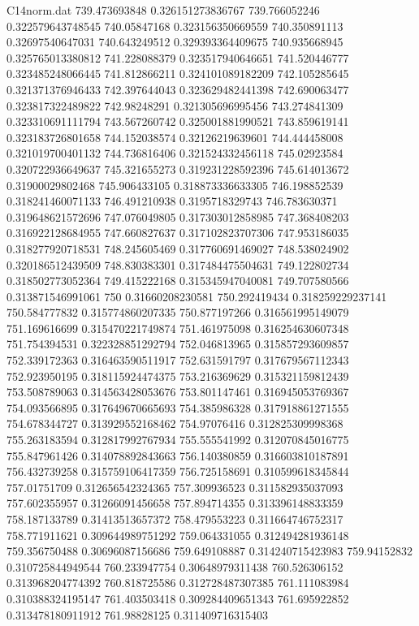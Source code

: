 \begin{filecontents}{C14norm.dat}
739.473693848			0.326151273836767
739.766052246			0.322579643748545
740.05847168			0.323156350669559
740.350891113			0.32697540647031
740.643249512			0.329393364409675
740.935668945			0.325765013380812
741.228088379			0.323517940646651
741.520446777			0.323485248066445
741.812866211			0.324101089182209
742.105285645			0.321371376946433
742.397644043			0.323629482441398
742.690063477			0.323817322489822
742.98248291			0.321305696995456
743.274841309			0.323310691111794
743.567260742			0.325001881990521
743.859619141			0.323183726801658
744.152038574			0.32126219639601
744.444458008			0.321019700401132
744.736816406			0.321524332456118
745.02923584			0.320722936649637
745.321655273			0.319231228592396
745.614013672			0.31900029802468
745.906433105			0.318873336633305
746.198852539			0.318241460071133
746.491210938			0.3195718329743
746.783630371			0.319648621572696
747.076049805			0.317303012858985
747.368408203			0.316922128684955
747.660827637			0.317102823707306
747.953186035			0.318277920718531
748.245605469			0.317760691469027
748.538024902			0.320186512439509
748.830383301			0.317484475504631
749.122802734			0.318502773052364
749.415222168			0.315345947040081
749.707580566			0.313871546991061
750			0.31660208230581
750.292419434			0.318259229237141
750.584777832			0.315774860207335
750.877197266			0.316561995149079
751.169616699			0.315470221749874
751.461975098			0.316254630607348
751.754394531			0.322328851292794
752.046813965			0.315857293609857
752.339172363			0.316463590511917
752.631591797			0.317679567112343
752.923950195			0.318115924474375
753.216369629			0.315321159812439
753.508789063			0.314563428053676
753.801147461			0.316945053769367
754.093566895			0.317649670665693
754.385986328			0.317918861271555
754.678344727			0.313929552168462
754.97076416			0.312825309998368
755.263183594			0.312817992767934
755.555541992			0.312070845016775
755.847961426			0.314078892843663
756.140380859			0.316603810187891
756.432739258			0.315759106417359
756.725158691			0.310599618345844
757.01751709			0.312656542324365
757.309936523			0.311582935037093
757.602355957			0.31266091456658
757.894714355			0.313396148833359
758.187133789			0.31413513657372
758.479553223			0.311664746752317
758.771911621			0.309644989751292
759.064331055			0.312494281936148
759.356750488			0.30696087156686
759.649108887			0.314240715423983
759.94152832			0.310725844949544
760.233947754			0.30648979311438
760.526306152			0.313968204774392
760.818725586			0.312728487307385
761.111083984			0.310388324195147
761.403503418			0.309284409651343
761.695922852			0.313478180911912
761.98828125			0.311409716315403

\end{filecontents}
